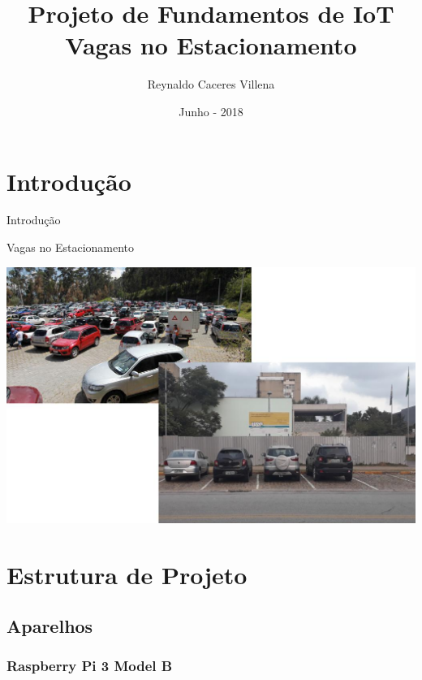 \documentclass{beamer}
\title[]{Projeto de Fundamentos de IoT \\Vagas no Estacionamento}
\author{Reynaldo Caceres Villena}
\institute{IME-USP}
\date{Junho - 2018}
\begin{document}
\begin{frame}{}
  \maketitle
\end{frame}

\begin{frame}{}
  \tableofcontents
\end{frame} 

\section{Introdução}
\begin{frame}{Introdução}
  \begin{block}{}
   \begin{center}
Vagas no Estacionamento    
   \end{center}  
  \end{block}
   \begin{center}
\includegraphics[width=.8\textwidth]{img/slide_1.jpeg}  
   \end{center}  

\end{frame}


\begin{frame}{}
  \tableofcontents
\end{frame}

\section{Estrutura de Projeto}
\subsection{Aparelhos}
\subsubsection{Raspberry Pi 3 Model B}
\end{document}
